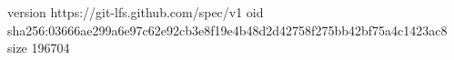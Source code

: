 version https://git-lfs.github.com/spec/v1
oid sha256:03666ae299a6e97c62e92cb3e8f19e4b48d2d42758f275bb42bf75a4c1423ac8
size 196704
